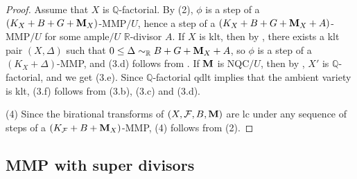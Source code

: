 \documentclass[11pt]{amsart}
\numberwithin{equation}{section}
\newcommand{\Mm}{{\bf{M}}}
\newcommand{\Qq}{\mathbb{Q}}
\newcommand{\Rr}{\mathbb{R}}
\newcommand{\Ff}{\mathcal{F}}
\theoremstyle{definition}
\theoremstyle{definition}
\theoremstyle{definition}
\begin{document}
\begin{proof}
Assume that $X$ is $\Qq$-factorial. By (2),  $\phi$ is a step of a $(K_X+B+G+\Mm_X)$-MMP$/U$, hence a step of a $(K_X+B+G+\Mm_X+A)$-MMP$/U$ for some ample$/U$ $\Rr$-divisor $A$. If $X$ is klt, then by \cite[Lemma 3.4]{HL22}, there exists a klt pair $(X,\Delta)$ such that $0\leq\Delta\sim_{\mathbb R}B+G+\Mm_X+A$, so $\phi$ is a step of a $(K_X+\Delta)$-MMP, and (3.d) follows from \cite[Corollaries 3.17, 3.18]{KM98}. If $\Mm$ is NQC$/U$, then by \cite[Corollary 5.20, Theorem 6.3]{HL21a}, $X'$ is $\Qq$-factorial, and we get (3.e). Since $\Qq$-factorial qdlt implies that the ambient variety is klt, (3.f)
 follows from (3.b), (3.c) and (3.d).

(4) Since the birational transforms of $(X,\Ff,B,\Mm)$ are lc under any sequence of steps of a $(K_{\Ff}+B+\Mm_X)$-MMP, (4) follows from (2).
\end{proof}

\subsection{MMP with super divisors}
\end{document}
